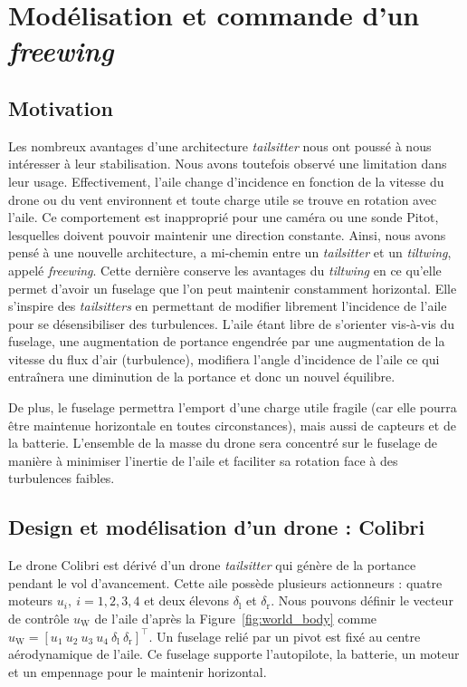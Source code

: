 
\chapter{Modélisation et commande d'un \textit{freewing}}
\minitoc
\label{chap:colibri}

\section{Motivation}
\label{sec:motivationcolibri}
Les nombreux avantages d'une architecture \textit{tailsitter} nous ont poussé à nous intéresser à leur stabilisation. Nous avons toutefois observé une limitation dans leur usage. Effectivement, l'aile change d'incidence en fonction de la vitesse du drone ou du vent environnent et toute charge utile se trouve en rotation avec l'aile. Ce comportement est inapproprié pour une caméra ou une sonde Pitot, lesquelles doivent pouvoir maintenir une direction constante. Ainsi, nous avons pensé à une nouvelle architecture, a mi-chemin entre un \textit{tailsitter} et un \textit{tiltwing}, appelé \textit{freewing}. Cette dernière conserve les avantages du \textit{tiltwing} en ce qu'elle permet d'avoir un fuselage que l'on peut maintenir constamment horizontal. Elle s'inspire des \textit{tailsitters} en permettant de modifier librement l'incidence de l'aile pour se désensibiliser des turbulences. L'aile étant libre de s'orienter vis-à-vis du fuselage, une augmentation de portance engendrée par une augmentation de la vitesse du flux d'air (turbulence), modifiera l'angle d'incidence de l'aile ce qui entraînera une diminution de la portance et donc un nouvel équilibre.

De plus, le fuselage permettra l'emport d'une charge utile fragile (car elle pourra être maintenue horizontale en toutes circonstances), mais aussi de capteurs et de la batterie. L'ensemble de la masse du drone sera concentré sur le fuselage de manière à minimiser l'inertie de l'aile et faciliter sa rotation face à des turbulences faibles.

\section{Design et modélisation d'un drone : Colibri}
\label{sec:model_colibri}

Le drone Colibri est dérivé d'un drone \textit{tailsitter} qui génère de la portance pendant le vol d'avancement. Cette aile possède plusieurs actionneurs : quatre moteurs $u_{i}, ~i = 1,2,3,4$ et deux élevons $\delta_{\text{l}}$ et $\delta_{\text{r}}$. Nous pouvons définir le vecteur de contrôle $u_{\text{W}}$ de l'aile d'après la Figure~\ref{fig:world_body} comme $u_{\text{W}} = [u_{1}~u_{2}~u_{3}~u_{4}~\delta_{\text{l}}~\delta_{\text{r}}]^\top$. Un fuselage relié par un pivot est fixé au centre aérodynamique de l'aile. Ce fuselage supporte l'autopilote, la batterie, un moteur et un empennage pour le maintenir horizontal.

